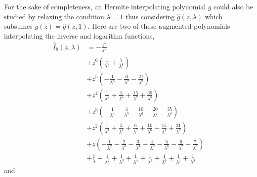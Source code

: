 For the sake of completeness, an Hermite interpolating polynomial $g$ could
also be studied by relaxing the condition $\lambda=1$ thus considering
$\hat{g}(z,\lambda)$ which subsumes $g(z)=\hat{g}(z,1)$. Here are two of these
augmented polynomials interpolating the inverse and logarithm functions,
\begin{displaymath}
\begin{split}
\hat{I}_{8}{\left (z, \lambda \right )} &= - \frac{z^{7}}{\lambda^{8}} \\
&+ z^{6} \left(\frac{1}{\lambda^{7}} + \frac{7}{\lambda^{8}}\right) \\
&+ z^{5} \left(- \frac{1}{\lambda^{6}} - \frac{6}{\lambda^{7}} - \frac{21}{\lambda^{8}}\right) \\
&+ z^{4} \left(\frac{1}{\lambda^{5}} + \frac{5}{\lambda^{6}} + \frac{15}{\lambda^{7}} + \frac{35}{\lambda^{8}}\right) \\
&+ z^{3} \left(- \frac{1}{\lambda^{4}} - \frac{4}{\lambda^{5}} - \frac{10}{\lambda^{6}} - \frac{20}{\lambda^{7}} - \frac{35}{\lambda^{8}}\right) \\
&+ z^{2} \left(\frac{1}{\lambda^{3}} + \frac{3}{\lambda^{4}} + \frac{6}{\lambda^{5}} + \frac{10}{\lambda^{6}} + \frac{15}{\lambda^{7}} + \frac{21}{\lambda^{8}}\right) \\
&+ z \left(- \frac{1}{\lambda^{2}} - \frac{2}{\lambda^{3}} - \frac{3}{\lambda^{4}} - \frac{4}{\lambda^{5}} - \frac{5}{\lambda^{6}} - \frac{6}{\lambda^{7}} - \frac{7}{\lambda^{8}}\right) \\
&+ \frac{1}{\lambda} + \frac{1}{\lambda^{2}} + \frac{1}{\lambda^{3}} + \frac{1}{\lambda^{4}} + \frac{1}{\lambda^{5}} + \frac{1}{\lambda^{6}} + \frac{1}{\lambda^{7}} + \frac{1}{\lambda^{8}}
\end{split}
\end{displaymath}
and
